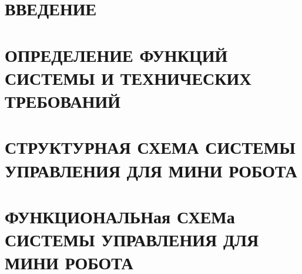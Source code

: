 
\section*{ВВЕДЕНИЕ}


\section{ОПРЕДЕЛЕНИЕ ФУНКЦИЙ СИСТЕМЫ И ТЕХНИЧЕСКИХ ТРЕБОВАНИЙ}


\section{СТРУКТУРНАЯ СХЕМА СИСТЕМЫ УПРАВЛЕНИЯ ДЛЯ МИНИ РОБОТА }


\section{ФУНКЦИОНАЛЬНая СХЕМа СИСТЕМЫ УПРАВЛЕНИЯ ДЛЯ МИНИ РОБОТА}











% 
